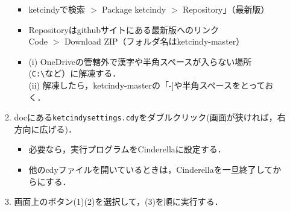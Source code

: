 \documentclass{ujarticle}
\begin{document}
\begin{enumerate}[\bf\large 1.]
\begin{enumerate}[(1)]
\begin{itemize}
     \item ketcindyで検索 $>$ Package ketcindy $>$ {\color{red}Repository}」（最新版）
     \item Repositoryはgithubサイトにある{\color{red}最新版}へのリンク\\
        \hspace*{10mm}Code $>$ Download ZIP（フォルダ名はketcindy-master）
     \item {}(i) {\color{red}OneDriveの管轄外で漢字や半角スペースが入らない場所(\verb|C:\|など）}に解凍する．\\
(ii) 解凍したら，{\color{red}ketcindy-masterの「-]や半角スペースをとっておく．}
     \end{itemize}
\item docにある\verb|ketcindysettings.cdy|をダブルクリック(画面が狭ければ，右方向に広げる)．
    \begin{itemize}
    \item 必要なら，実行プログラムをCinderellaに設定する．
    \item 他のcdyファイルを開いているときは，Cinderellaを一旦終了してからにする．

   \end{itemize}
  \item 画面上のボタン(1)(2)を選択して，(3)を順に実行する．
  \end{enumerate}



\end{enumerate}
\end{document}
